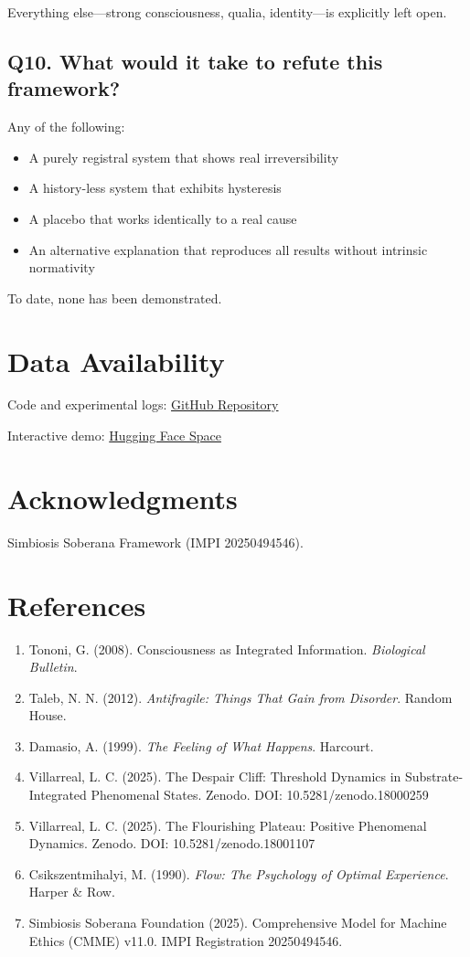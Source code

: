 \documentclass[a4paper,11pt,twocolumn]{article}
\begin{document}
Everything else---strong consciousness, qualia, identity---is explicitly left open.

\subsection*{Q10. What would it take to refute this framework?}

Any of the following:

\begin{itemize}
    \item A purely registral system that shows real irreversibility
    \item A history-less system that exhibits hysteresis
    \item A placebo that works identically to a real cause
    \item An alternative explanation that reproduces all results without intrinsic normativity
\end{itemize}

To date, none has been demonstrated.

\section*{Data Availability}
Code and experimental logs: \href{https://github.com/villalc/phenomenal-dynamics-trilogy}{GitHub Repository}

Interactive demo: \href{https://huggingface.co/spaces/villalc/complete-entity-demo}{Hugging Face Space}

\section*{Acknowledgments}
Simbiosis Soberana Framework (IMPI 20250494546).


\section*{References}
\begin{enumerate}
    \item Tononi, G. (2008). Consciousness as Integrated Information. \textit{Biological Bulletin}.
    \item Taleb, N. N. (2012). \textit{Antifragile: Things That Gain from Disorder}. Random House.
    \item Damasio, A. (1999). \textit{The Feeling of What Happens}. Harcourt.
    \item Villarreal, L. C. (2025). The Despair Cliff: Threshold Dynamics in Substrate-Integrated Phenomenal States. Zenodo. DOI: 10.5281/zenodo.18000259
    \item Villarreal, L. C. (2025). The Flourishing Plateau: Positive Phenomenal Dynamics. Zenodo. DOI: 10.5281/zenodo.18001107
    \item Csikszentmihalyi, M. (1990). \textit{Flow: The Psychology of Optimal Experience}. Harper \& Row.
    \item Simbiosis Soberana Foundation (2025). Comprehensive Model for Machine Ethics (CMME) v11.0. IMPI Registration 20250494546.
\end{enumerate}
\end{document}
